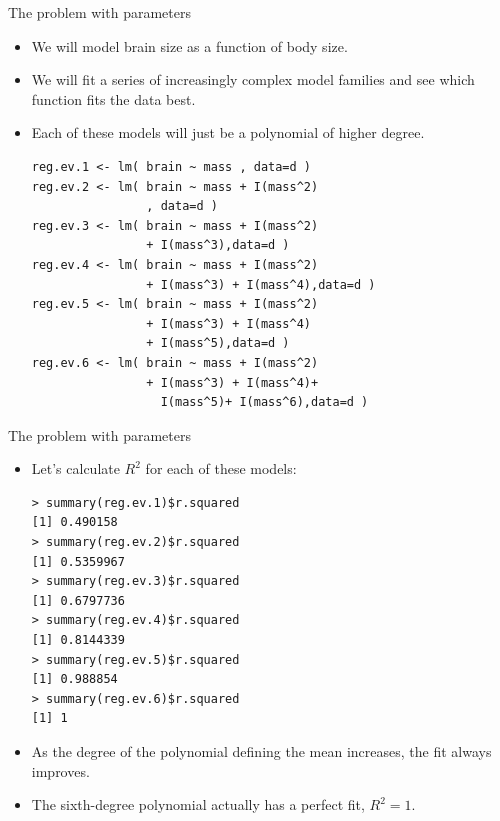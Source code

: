 \documentclass[handout]{beamer}
\begin{document}
\begin{frame}[fragile]{The problem with parameters}
\scriptsize{

\begin{itemize}

\item We will model brain size as a function of body size.

\item We will fit a series of increasingly complex model families and see which function fits the data best.

\item Each of these models will just be a polynomial of higher degree.

\begin{verbatim}
reg.ev.1 <- lm( brain ~ mass , data=d )
reg.ev.2 <- lm( brain ~ mass + I(mass^2)
                , data=d )
reg.ev.3 <- lm( brain ~ mass + I(mass^2)
                + I(mass^3),data=d )
reg.ev.4 <- lm( brain ~ mass + I(mass^2)
                + I(mass^3) + I(mass^4),data=d )
reg.ev.5 <- lm( brain ~ mass + I(mass^2)
                + I(mass^3) + I(mass^4)
                + I(mass^5),data=d )
reg.ev.6 <- lm( brain ~ mass + I(mass^2)
                + I(mass^3) + I(mass^4)+ 
                  I(mass^5)+ I(mass^6),data=d ) 
\end{verbatim}


\end{itemize}


} 
\end{frame}

\begin{frame}[fragile]{The problem with parameters}
\scriptsize{

\begin{itemize}

\item Let's calculate $R^2$ for each of these models:

\begin{verbatim}
> summary(reg.ev.1)$r.squared
[1] 0.490158
> summary(reg.ev.2)$r.squared
[1] 0.5359967
> summary(reg.ev.3)$r.squared
[1] 0.6797736
> summary(reg.ev.4)$r.squared
[1] 0.8144339
> summary(reg.ev.5)$r.squared
[1] 0.988854
> summary(reg.ev.6)$r.squared
[1] 1
\end{verbatim}

\item As the degree of the polynomial defining the mean increases, the fit always improves.

\item The sixth-degree polynomial actually has a perfect fit, $R  ^2 = 1$.

\end{itemize}


} 
\end{frame}
\end{document}
